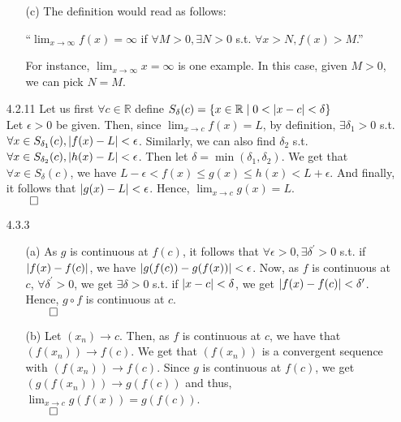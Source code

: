 \documentclass[11pt]{article}
\DeclarePairedDelimiter\abs{\lvert}{\rvert}%
\newcommand{\reals}{\mathbb{R}}
\begin{document}
\begin{itemize}
\begin{itemize}
            \item[(c)]
                The definition would read as follows:

                ``$\lim_{x \to \infty} f(x) = \infty$ if $\forall M > 0,
                \exists N > 0$ s.t. $\forall x > N, f(x) > M$.''

                For instance, $\lim_{x \to \infty} x = \infty$ is one example.
                In this case, given $M > 0$, we can pick $N = M$.
        \end{itemize}

    \item[4.2.11]
        Let us first $\forall c \in \reals$ define $S_\delta(c) = \{x \in
        \reals \mid 0 < \abs{x - c} < \delta\}$
        \\
        Let $\epsilon > 0$ be given. Then, since $\lim_{x \to c} f(x) = L$, by
        definition, $\exists \delta_1 > 0$ s.t. $\forall x \in S_{\delta_1}(c),
        \abs{f(x) - L} < \epsilon$. Similarly, we can also find $\delta_2$ s.t.
        $\forall x \in S_{\delta_2}(c), \abs{h(x) - L} < \epsilon$. Then let
        $\delta = \min{(\delta_1, \delta_2)}$. We get that $\forall x \in
        S_{\delta}(c)$, we have $L - \epsilon < f(x) \leq g(x) \leq h(x) < L +
        \epsilon$. And finally, it follows that $\abs{g(x) - L} < \epsilon$.
        Hence, $\lim_{x \to c}g(x) = L$.\\
        $\qed$

    \item[4.3.3]
        \begin{itemize} 
            \item[(a)]
                As $g$ is continuous at $f(c)$, it follows that $\forall
                \epsilon > 0, \exists \delta^\prime > 0$ s.t. if $\abs{f(x) -
                f(c)}$, we have $\abs{g(f(c)) - g(f(x))} < \epsilon$. Now, as
                $f$ is continuous at $c$, $\forall \delta^\prime > 0$, we get
                $\exists \delta > 0$ s.t. if $\abs{x - c} < \delta$, we get
                $\abs{f(x) - f(c)} < \delta^\prime$. Hence, $g \circ f$ is
                continuous at $c$.\\
                $\qed$

            \item[(b)]
                Let $(x_n) \to c$. Then, as $f$ is continuous at $c$, we have
                that $(f(x_n)) \to f(c)$. We get that $(f(x_n))$ is a
                convergent sequence with $(f(x_n)) \to f(c)$. Since $g$ is
                continuous at $f(c)$, we get $(g(f(x_n))) \to g(f(c))$ and
                thus, $\lim_{x \to c} g(f(x)) = g(f(c))$.\\
                $\qed$
        \end{itemize} 


\end{itemize}
\end{document}
